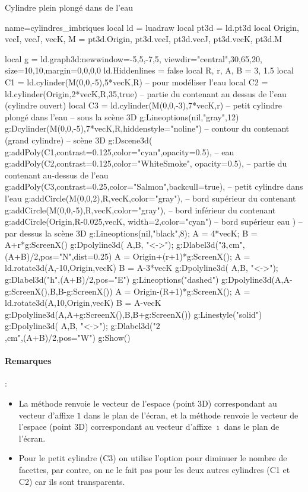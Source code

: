 \begin{demo}{Cylindre plein plongé dans de l'eau}
\begin{luadraw}{name=cylindres_imbriques}
local ld = luadraw
local pt3d = ld.pt3d
local Origin, vecI, vecJ, vecK, M = pt3d.Origin, pt3d.vecI, pt3d.vecJ, pt3d.vecK, pt3d.M

local g = ld.graph3d:new{window={-5,5,-7,5}, viewdir={"central",30,65,20},
    size={10,10},margin={0,0,0,0}}
ld.Hiddenlines = false
local R, r, A, B = 3, 1.5
local C1 = ld.cylinder(M(0,0,-5),5*vecK,R) -- pour modéliser l'eau
local C2 = ld.cylinder(Origin,2*vecK,R,35,true) -- partie du contenant au dessus de l'eau (cylindre ouvert)
local C3 = ld.cylinder(M(0,0,-3),7*vecK,r) -- petit cylindre plongé dans l'eau
-- sous la scène 3D
g:Lineoptions(nil,"gray",12)
g:Dcylinder(M(0,0,-5),7*vecK,R,{hiddenstyle="noline"}) -- contour du contenant (grand cylindre)
-- scène 3D
g:Dscene3d(
    g:addPoly(C1,{contrast=0.125,color="cyan",opacity=0.5}), -- eau
    g:addPoly(C2,{contrast=0.125,color="WhiteSmoke", opacity=0.5}), -- partie du contenant au-dessus de l'eau
    g:addPoly(C3,{contrast=0.25,color="Salmon",backcull=true}), -- petit cylindre dans l'eau
    g:addCircle(M(0,0,2),R,vecK,{color="gray"}), -- bord supérieur du contenant
    g:addCircle(M(0,0,-5),R,vecK,{color="gray"}), -- bord inférieur du contenant
    g:addCircle(Origin,R-0.025,vecK, {width=2,color="cyan"}) -- bord supérieur eau
)
-- par dessus la scène 3D
g:Lineoptions(nil,"black",8); A = 4*vecK; B = A+r*g:ScreenX()
g:Dpolyline3d( {A,B}, "<->"); g:Dlabel3d("$3\\,$cm",(A+B)/2,{pos="N",dist=0.25})
A = Origin+(r+1)*g:ScreenX(); A = ld.rotate3d(A,-10,{Origin,vecK})
B = A-3*vecK
g:Dpolyline3d( {A,B}, "<->"); g:Dlabel3d("h",(A+B)/2,{pos="E"})
g:Lineoptions("dashed")
g:Dpolyline3d({{A,A-g:ScreenX()},{B,B-g:ScreenX()}})
A = Origin-(R+1)*g:ScreenX(); A = ld.rotate3d(A,10,{Origin,vecK})
B = A-vecK
g:Dpolyline3d({{A,A+g:ScreenX()},{B,B+g:ScreenX()}})
g:Linestyle("solid")
g:Dpolyline3d( {A,B}, "<->"); g:Dlabel3d("$2$\\,cm",(A+B)/2,{pos="W"})
g:Show()
\end{luadraw}
\end{demo}

\paragraph{Remarques} : 
\begin{itemize}
    \item La méthode  renvoie le vecteur de l'espace (point 3D) correspondant au vecteur d'affixe $1$ dans le plan de l'écran, et la méthode  renvoie le vecteur de l'espace (point 3D) correspondant au vecteur d'affixe $\imath$ dans le plan de l'écran.
    \item Pour le petit cylindre (C3) on utilise l'option  pour diminuer le nombre de facettes, par contre, on ne le fait pas pour les deux autres cylindres (C1 et C2) car ils sont transparents.
\end{itemize}

